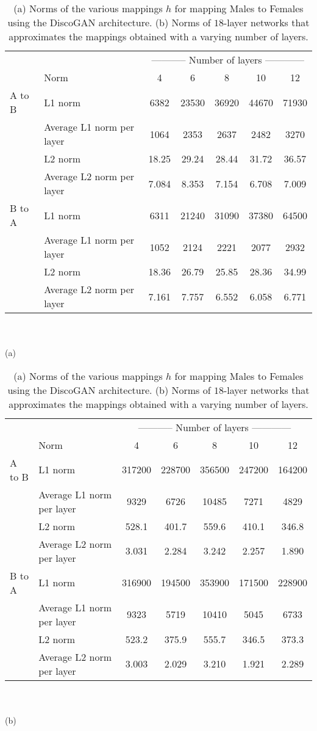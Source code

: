 \documentclass{article} %
\begin{document}
\begin{table}[h]\caption{(a) Norms of the various mappings $h$ for mapping Males to Females using the DiscoGAN architecture. (b) Norms of $18$-layer networks that approximates the mappings obtained with a varying number of layers.}\label{tab:a001} 

\begin{center}
\begin{tabular}{llccccc}
\toprule
& & \multicolumn{5}{c}{----------- Number of layers ------------}\\
& Norm & 4 & 6 & 8 & 10 & 12 \\
\midrule
A to B &L1 norm & 6382  & 23530 & 36920  & 44670 & 71930 \\
&Average L1 norm per layer & 1064  & 2353  & 2637   & 2482   & 3270 \\
&L2 norm & 18.25 & 29.24 & 28.44  & 31.72  & 36.57 \\
&Average L2 norm per layer & 7.084 & 8.353 & 7.154  & 6.708  & 7.009 \\
\midrule
B to A&L1 norm & 6311  & 21240 & 31090  & 37380 & 64500 \\
&Average L1 norm per layer & 1052  & 2124  & 2221   & 2077   & 2932 \\
&L2 norm & 18.36 & 26.79 & 25.85  & 28.36  & 34.99 \\
&Average L2 norm per layer & 7.161 & 7.757 & 6.552  & 6.058  & 6.771 \\
\bottomrule
\end{tabular}\\~\\
(a) \\
\end{center}

\begin{center}
\begin{tabular}{llccccc}
\toprule
& & \multicolumn{5}{c}{----------- Number of layers ------------}\\
& Norm & 4 & 6 & 8 & 10 & 12 \\
\midrule
A to B & L1 norm & 317200 & 228700 & 356500 & 247200 & 164200  \\
&Average L1 norm per layer & 9329 & 6726 & 10485 & 7271 & 4829  \\ 
&L2 norm  &528.1 & 401.7 & 559.6 & 410.1 & 346.8 \\ 
&Average L2 norm per layer &3.031 & 2.284 & 3.242 &2.257 & 1.890 \\
\midrule
B to A&L1 norm & 316900 & 194500 & 353900 & 171500 & 228900 \\
&Average L1 norm per layer & 9323 & 5719 & 10410 & 5045 & 6733\\
&L2 norm & 523.2 & 375.9 & 555.7 & 346.5 & 373.3  \\
&Average L2 norm per layer & 3.003 & 2.029 &  3.210 & 1.921 & 2.289  \\
\bottomrule
\end{tabular}\\~\\
(b) \\
\end{center}

\end{table}
\end{document}
